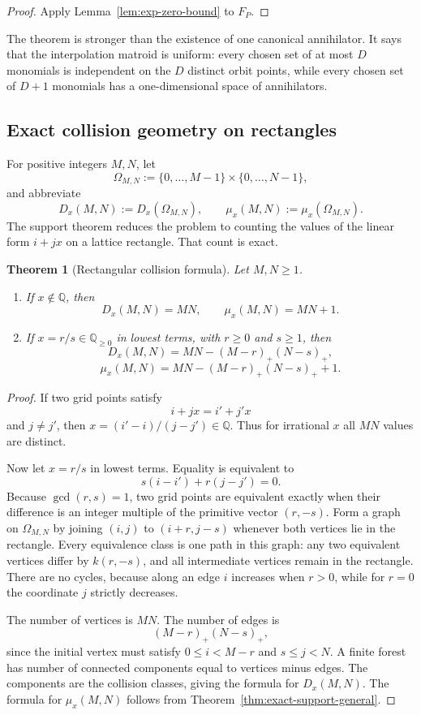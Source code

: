 \documentclass[11pt,oneside]{article}
\newtheorem{theorem}{Theorem}[section]
\theoremstyle{definition}
\theoremstyle{remark}
\newcommand{\Q}{\mathbb Q}
\begin{document}
\begin{proof}
Apply Lemma~\ref{lem:exp-zero-bound} to $F_P$.
\end{proof}

The theorem is stronger than the existence of one canonical annihilator.  It says that the
interpolation matroid is uniform: every chosen set of at most $D$ monomials is independent on
the $D$ distinct orbit points, while every chosen set of $D+1$ monomials has a one-dimensional
space of annihilators.

\subsection{Exact collision geometry on rectangles}
\label{sec:sparse-collisions}

For positive integers $M,N$, let
\[
  \Omega_{M,N}:=\{0,\dots,M-1\}\times\{0,\dots,N-1\},
\]
and abbreviate
\[
  D_x(M,N):=D_x(\Omega_{M,N}),\qquad
  \mu_x(M,N):=\mu_x(\Omega_{M,N}).
\]
The support theorem reduces the problem to counting the values of the linear form
$i+jx$ on a lattice rectangle.  That count is exact.

\begin{theorem}[Rectangular collision formula]
\label{thm:rectangular-collision}
Let $M,N\ge1$.
\begin{enumerate}
\item If $x\notin\Q$, then
\[
  D_x(M,N)=MN,
  \qquad
  \mu_x(M,N)=MN+1.
\]
\item If $x=r/s\in\Q_{\ge0}$ in lowest terms, with $r\ge0$ and $s\ge1$, then
\[
  D_x(M,N)=MN-(M-r)_+(N-s)_+,
\]
\[
  \boxed{\ 
  \mu_x(M,N)=MN-(M-r)_+(N-s)_++1.
  \ }
\]
\end{enumerate}
\end{theorem}

\begin{proof}
If two grid points satisfy
\[
  i+jx=i'+j'x
\]
and $j\ne j'$, then $x=(i'-i)/(j-j')\in\Q$.  Thus for irrational $x$ all $MN$
values are distinct.

Now let $x=r/s$ in lowest terms.  Equality is equivalent to
\[
  s(i-i')+r(j-j')=0.
\]
Because $\gcd(r,s)=1$, two grid points are equivalent exactly when their difference is an
integer multiple of the primitive vector $(r,-s)$.  Form a graph on $\Omega_{M,N}$ by joining
$(i,j)$ to $(i+r,j-s)$ whenever both vertices lie in the rectangle.  Every equivalence class
is one path in this graph: any two equivalent vertices differ by $k(r,-s)$, and all
intermediate vertices remain in the rectangle.  There are no cycles, because along an edge
$i$ increases when $r>0$, while for $r=0$ the coordinate $j$ strictly decreases.

The number of vertices is $MN$.  The number of edges is
\[
  (M-r)_+(N-s)_+,
\]
since the initial vertex must satisfy $0\le i<M-r$ and $s\le j<N$.  A finite forest has
number of connected components equal to vertices minus edges.  The components are the
collision classes, giving the formula for $D_x(M,N)$.  The formula for $\mu_x(M,N)$ follows
from Theorem~\ref{thm:exact-support-general}.
\end{proof}
\end{document}
